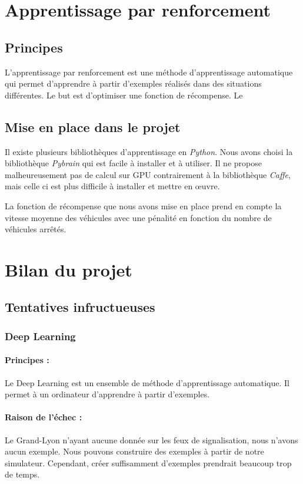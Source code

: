 \documentclass[11pt]{article}
\begin{document}
\section{Apprentissage par renforcement}
\subsection{Principes}
L'apprentissage par renforcement est une méthode d'apprentissage automatique qui permet d'apprendre à partir d'exemples réalisés dans des situations différentes. Le but est d'optimiser une fonction de récompense. Le 

\subsection{Mise en place dans le projet}
Il existe plusieurs bibliothèques d'apprentissage en \emph{Python}. Nous avons choisi la bibliothèque \emph{Pybrain} qui est facile à installer et à utiliser. Il ne propose malheureusement pas de calcul sur GPU contrairement à la bibliothèque \emph{Caffe}, mais celle ci est plus difficile à installer et mettre en \oe uvre. 

La fonction de récompense que nous avons mise en place prend en compte la vitesse moyenne des véhicules avec une pénalité en fonction du nombre de véhicules arrêtés. 

\section{Bilan du projet}
\subsection{Tentatives infructueuses}
\subsubsection{Deep Learning}
\paragraph{Principes :}{
Le Deep Learning est un ensemble de méthode d'apprentissage automatique. Il permet à un ordinateur d'apprendre à partir d'exemples.
}
\paragraph{Raison de l'échec :}{
Le Grand-Lyon n'ayant aucune donnée sur les feux de signalisation, nous n'avons aucun exemple. Nous pouvons construire des exemples à partir de notre simulateur. Cependant, créer suffisamment d'exemples prendrait beaucoup trop de temps. 
}
\end{document}
